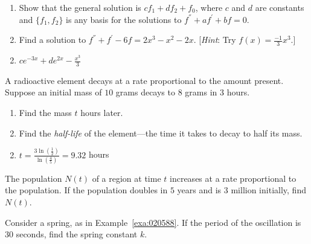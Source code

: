 \begin{multicols}{2}
\begin{ex}
\begin{enumerate}[label={\alph*.}]
\item Show that the general solution is $cf_{1} + df_{2} + f_{0}$, where $c$ and $d$ are constants and $\{f_{1}, f_{2}\}$ is any basis for the solutions to $f^\dprime + af^\prime + bf = 0$.

\item Find a solution to $f^\dprime + f^\prime - 6f = 2x^{3} - x^{2} - 2x$. [\textit{Hint}: Try $f(x) = \frac{-1}{3}x^3$.]

\end{enumerate}
\begin{sol}
\begin{enumerate}[label={\alph*.}]
\setcounter{enumi}{1}
\item  $ce^{-3x} + de^{2x} - \frac{x^3}{3}$

\end{enumerate}
\end{sol}
\end{ex}

\begin{ex}
A radioactive element decays at a rate proportional to the amount present. Suppose an initial mass of $10$ grams decays to $8$ grams in $3$ hours.

\begin{enumerate}[label={\alph*.}]
\item Find the mass $t$ hours later.

\item Find the \textit{half-life} of the element---the time it takes to decay to half its mass.

\end{enumerate}
\begin{sol}
\begin{enumerate}[label={\alph*.}]
\setcounter{enumi}{1}
\item  $t = \frac{3 \ln(\frac{1}{2})}{\ln(\frac{4}{5})} = 9.32$ hours

\end{enumerate}
\end{sol}
\end{ex}

\begin{ex}
The population $N(t)$ of a region at time $t$ increases at a rate proportional to the population. If the population doubles in $5$ years and is $3$ million initially, find $N(t)$.
\end{ex}

\begin{ex}
Consider a spring, as in Example~\ref{exa:020588}. If the period of the oscillation is $30$ seconds, find the spring constant $k$.


\end{ex}
\end{multicols}
